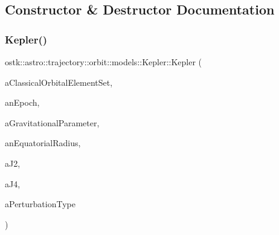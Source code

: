 \subsection{Constructor \& Destructor Documentation}
\mbox{\label{classostk_1_1astro_1_1trajectory_1_1orbit_1_1models_1_1_kepler_aebd9792c0965b4539a553afad07aff7a}} 
\subsubsection{\texorpdfstring{Kepler()}{Kepler()}\hspace{0.1cm}{\footnotesize\ttfamily [1/2]}}
{\footnotesize\ttfamily ostk\+::astro\+::trajectory\+::orbit\+::models\+::\+Kepler\+::\+Kepler (\begin{DoxyParamCaption}\item[{const \hyperlink{classostk_1_1astro_1_1trajectory_1_1orbit_1_1models_1_1kepler_1_1_c_o_e}{C\+OE} \&}]{a\+Classical\+Orbital\+Element\+Set,  }\item[{const Instant \&}]{an\+Epoch,  }\item[{const Derived \&}]{a\+Gravitational\+Parameter,  }\item[{const Length \&}]{an\+Equatorial\+Radius,  }\item[{const Real \&}]{a\+J2,  }\item[{const Real \&}]{a\+J4,  }\item[{const \hyperlink{classostk_1_1astro_1_1trajectory_1_1orbit_1_1models_1_1_kepler_a3750f9177ff06a1938826e2c2881d5a9}{Kepler\+::\+Perturbation\+Type} \&}]{a\+Perturbation\+Type }\end{DoxyParamCaption})}

\mbox{\label{classostk_1_1astro_1_1trajectory_1_1orbit_1_1models_1_1_kepler_af91d91131679176d920c658facaab07c}} 
